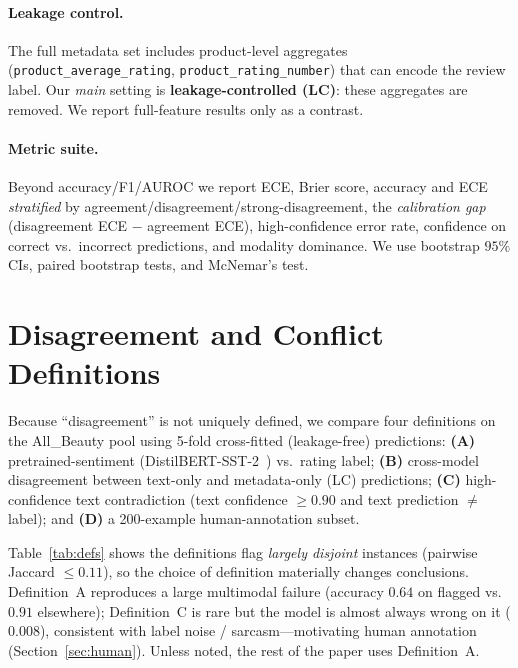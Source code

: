 \documentclass[11pt]{article}
\begin{document}
\paragraph{Leakage control.} The full metadata set includes product-level
aggregates (\texttt{product\_average\_rating}, \texttt{product\_rating\_number})
that can encode the review label. Our \emph{main} setting is
\textbf{leakage-controlled (LC)}: these aggregates are removed. We report
full-feature results only as a contrast.

\paragraph{Metric suite.} Beyond accuracy/F1/AUROC we report ECE, Brier score,
accuracy and ECE \emph{stratified} by agreement/disagreement/strong-disagreement,
the \emph{calibration gap} (disagreement ECE $-$ agreement ECE),
high-confidence error rate, confidence on correct vs.\ incorrect predictions,
and modality dominance. We use bootstrap $95\%$ CIs, paired bootstrap tests, and
McNemar's test.

\section{Disagreement and Conflict Definitions}\label{sec:defs}
Because ``disagreement'' is not uniquely defined, we compare four definitions on
the All\_Beauty pool using 5-fold cross-fitted (leakage-free) predictions:
\textbf{(A)} pretrained-sentiment (DistilBERT-SST-2~\citep{sanh2019distilbert})
vs.\ rating label; \textbf{(B)} cross-model disagreement between text-only and
metadata-only (LC) predictions; \textbf{(C)} high-confidence text contradiction
(text confidence $\ge0.90$ and text prediction $\neq$ label); and \textbf{(D)} a
200-example human-annotation subset.

Table~\ref{tab:defs} shows the definitions flag \emph{largely disjoint}
instances (pairwise Jaccard $\le0.11$), so the choice of definition materially
changes conclusions. Definition~A reproduces a large multimodal failure
(accuracy $0.64$ on flagged vs.\ $0.91$ elsewhere); Definition~C is rare but the
model is almost always wrong on it ($0.008$), consistent with label noise /
sarcasm---motivating human annotation (Section~\ref{sec:human}). Unless noted,
the rest of the paper uses Definition~A.
\end{document}
